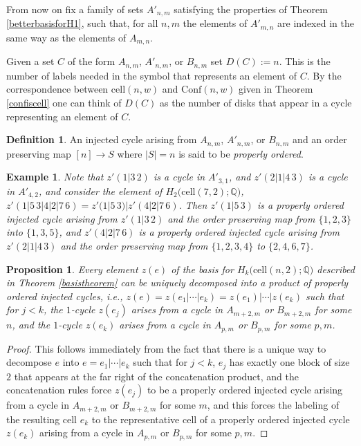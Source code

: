 \documentclass[12py]{amsart}%
\newtheorem{prop}[thm]{Proposition}
\newtheorem{exam}[thm]{Example}
\theoremstyle{definition}\newtheorem{definition}[thm]{Definition}
\theoremstyle{definition}
\newtheorem{defn}[thm]{Definition}
\newcommand{\Q}{\ensuremath{\mathbb{Q}}}
\begin{document}
From now on fix a family of sets $A'_{n,m}$ satisfying the properties of Theorem \ref{betterbasisforH1}, such that, for all $n,m$ the elements of $A'_{m,n}$ are indexed in the same way as the elements of $A_{m,n}$.

Given a set $C$ of the form $A_{n,m}$, $A'_{n,m}$, or $B_{n,m}$ set $D(C):=n$. This is the number of labels needed in the symbol that represents an element of $C$. By the correspondence between $\text{cell}(n,w)$ and $\text{Conf}(n,w)$ given in Theorem \ref{confiscell} one can think of $D(C)$ as the number of disks that appear in a cycle representing an element of $C$.

\begin{defn}
An injected cycle arising from $A_{n,m}$, $A'_{n,m}$, or $B_{n,m}$ and an order preserving map $[n]\to S$ where $|S|=n$ is said to be \emph{properly ordered}.
\end{defn}


\begin{exam}
Note that $z'(1|3\,2)$ is a cycle in $A'_{3,1}$, and $z'(2|1|4\,3)$ is a cycle in $A'_{4,2}$, and consider the element of $H_{2}\big(\text{cell}(7,2);\Q\big)$, $z'(1|5\,3|4|2|7\,6)=z'(1|5\,3)|z'(4|2|7\,6)$. Then $z'(1|5\,3)$ is a properly ordered injected cycle arising from $z'(1|3\,2)$ and the order preserving map from $\{1,2,3\}$ into $\{1, 3, 5\}$, and $z'(4|2|7\,6)$ is a properly ordered injected cycle arising from $z'(2|1|4\,3)$ and the order preserving map from $\{1,2,3,4\}$ to $\{2,4,6,7\}$.
\end{exam}

\begin{prop}
Every element $z(e)$ of the basis for $H_{k}\big(\text{cell}(n,2);\Q\big)$ described in Theorem \ref{basistheorem} can be uniquely decomposed into a product of properly ordered injected cycles, i.e., $z(e)=z(e_{1}|\cdots|e_{k})=z(e_{1})|\cdots|z(e_{k})$ such that for $j<k$, the $1$-cycle $z(e_{j})$ arises from a cycle in $A_{m+2,m}$ or $B_{m+2,m}$ for some $n$, and the $1$-cycle $z(e_{k})$ arises from a cycle in $A_{p,m}$ or $B_{p,m}$ for some $p,m$.
\end{prop}

\begin{proof}
This follows immediately from the fact that there is a unique way to decompose $e$ into $e=e_{1}|\cdots|e_{k}$ such that for $j<k$, $e_{j}$ has exactly one block of size $2$ that appears at the far right of the concatenation product, and the concatenation rules force $z(e_{j})$ to be a properly ordered injected cycle arising from a cycle in $A_{m+2,m}$ or $B_{m+2,m}$ for some $m$, and this forces the labeling of the resulting cell $e_{k}$ to the representative cell of a properly ordered injected cycle $z(e_{k})$ arising from a cycle in $A_{p,m}$ or $B_{p,m}$ for some $p,m$.
\end{proof}
\end{document}
